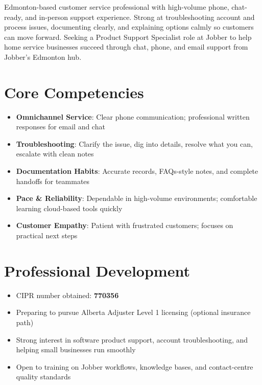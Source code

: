 \documentclass[11pt,a4paper,sans]{moderncv}
\begin{document}
\makecvtitle

\vspace{6pt}
\small{Edmonton-based customer service professional with high-volume phone, chat-ready, and in-person support experience. Strong at troubleshooting account and process issues, documenting clearly, and explaining options calmly so customers can move forward. Seeking a Product Support Specialist role at Jobber to help home service businesses succeed through chat, phone, and email support from Jobber's Edmonton hub.}

\section{Core Competencies}
\vspace{1pt}
\begin{itemize}
\item \textbf{Omnichannel Service}: Clear phone communication; professional written responses for email and chat
\item \textbf{Troubleshooting}: Clarify the issue, dig into details, resolve what you can, escalate with clean notes
\item \textbf{Documentation Habits}: Accurate records, FAQs-style notes, and complete handoffs for teammates
\item \textbf{Pace \& Reliability}: Dependable in high-volume environments; comfortable learning cloud-based tools quickly
\item \textbf{Customer Empathy}: Patient with frustrated customers; focuses on practical next steps
\end{itemize}

\section{Professional Development}
\vspace{1pt}
\begin{itemize}
\item CIPR number obtained: \textbf{770356}
\item Preparing to pursue Alberta Adjuster Level 1 licensing (optional insurance path)
\item Strong interest in software product support, account troubleshooting, and helping small businesses run smoothly
\item Open to training on Jobber workflows, knowledge bases, and contact-centre quality standards
\end{itemize}
\end{document}
